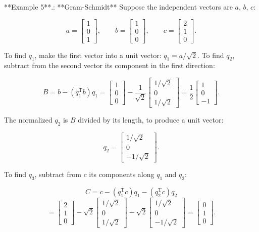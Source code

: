 

**Example 5**.: **Gram-Schmidt** Suppose the independent vectors are \(a\), \(b\), \(c\):

\[a=\begin{bmatrix}1\\ 0\\ 1\end{bmatrix},\qquad b=\begin{bmatrix}1\\ 0\\ 0\end{bmatrix},\qquad c=\begin{bmatrix}2\\ 1\\ 0\end{bmatrix}.\]

To find \(q_{1}\), make the first vector into a unit vector: \(q_{1}=a/\sqrt{2}\). To find \(q_{2}\), subtract from the second vector its component in the first direction:

\[B=b-(q_{1}^{\mathrm{T}}b)q_{1}=\begin{bmatrix}1\\ 0\\ 0\end{bmatrix}-\frac{1}{\sqrt{2}}\begin{bmatrix}1/\sqrt{2}\\ 0\\ 1/\sqrt{2}\end{bmatrix}=\frac{1}{2}\begin{bmatrix}1\\ 0\\ -1\end{bmatrix}.\]

The normalized \(q_{2}\) is \(B\) divided by its length, to produce a unit vector:

\[q_{2}=\begin{bmatrix}1/\sqrt{2}\\ 0\\ -1/\sqrt{2}\end{bmatrix}.\]

To find \(q_{3}\), subtract from \(c\) its components along \(q_{1}\) and \(q_{2}\):

\[C =c-(q_{1}^{\mathrm{T}}c)q_{1}-(q_{2}^{\mathrm{T}}c)q_{2}\] \[=\begin{bmatrix}2\\ 1\\ 0\end{bmatrix}-\sqrt{2}\begin{bmatrix}1/\sqrt{2}\\ 0\\ 1/\sqrt{2}\end{bmatrix}-\sqrt{2}\begin{bmatrix}1/\sqrt{2}\\ 0\\ -1/\sqrt{2}\end{bmatrix}=\begin{bmatrix}0\\ 1\\ 0\end{bmatrix}.\]

